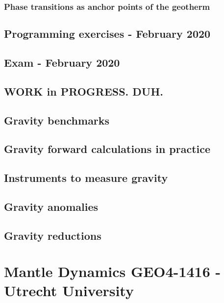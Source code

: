 \documentclass[a4paper]{article}
\begin{document}
\subsubsection{Phase transitions as anchor points of the geotherm} %
\label{section-anchor points}  %

\subsection{Programming exercises - February 2020} 
\subsection{Exam - February 2020} 

\newpage
\subsection{WORK in PROGRESS. DUH.} %

\subsection{Gravity benchmarks} 
\subsection{Gravity forward calculations in practice} 
\subsection{Instruments to measure gravity} 
\subsection{Gravity anomalies} 
\subsection{Gravity reductions} 

\newpage
\section{Mantle Dynamics GEO4-1416 - Utrecht University}
\end{document}
